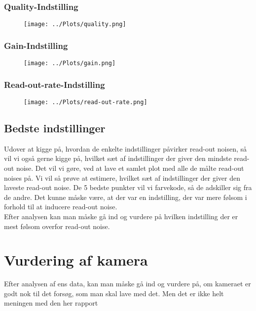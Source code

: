\documentclass[working]{tuftebook}
\begin{document}
\subsubsection*{Quality-Indstilling}
\begin{figure}[ht]
\centering
{}
\texttt{[image: ../Plots/quality.png]}	
\end{figure}

\subsubsection*{Gain-Indstilling}
\begin{figure}[ht]
\centering
{}
\texttt{[image: ../Plots/gain.png]}	
\end{figure}

\subsubsection*{Read-out-rate-Indstilling}
\begin{figure}[ht]
\centering
{}
\texttt{[image: ../Plots/read-out-rate.png]}	

\end{figure}
\subsection{Bedste indstillinger}
Udover at kigge på, hvordan de enkelte indstillinger påvirker read-out noisen, så  vil vi også gerne kigge på, hvilket sæt af indstillinger der giver den mindste read-out noise. Det vil vi gøre, ved at lave et samlet plot med alle de målte read-out noises på. Vi vil så prøve at estimere, hvilket sæt af indstillinger der giver den laveste read-out noise. De 5 bedste punkter vil vi farvekode, så de adskiller sig fra de andre. Det kunne måske være, at der var en indstilling, der var mere følsom i forhold til at inducere read-out noise. 
\\
Efter analysen kan man måske gå ind og vurdere på hvilken indstilling der er mest følsom overfor read-out noise. 

\section{Vurdering af kamera}
Efter analysen af ens data, kan man måske gå ind og vurdere på, om kameraet er godt nok til det forsøg, som man skal lave med det. Men det er ikke helt meningen med den her rapport
\end{document}
